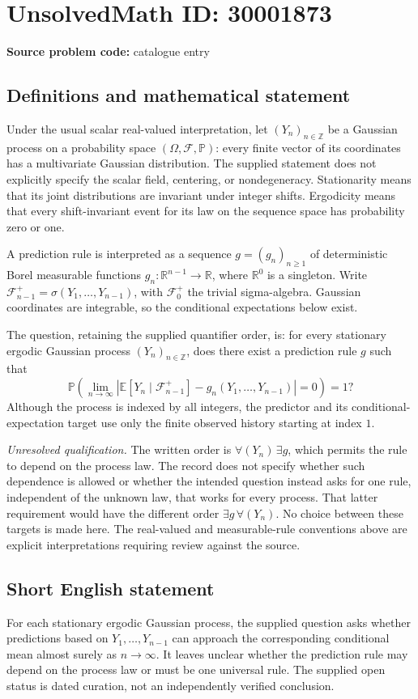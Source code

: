 \documentclass[11pt]{article}
\newcommand{\Z}{\mathbb{Z}}
\newcommand{\R}{\mathbb{R}}
\begin{document}
\section*{UnsolvedMath ID: 30001873}
\textbf{Source problem code:} catalogue entry
\subsection{Definitions and mathematical statement}
Under the usual scalar real-valued interpretation, let \((Y_n)_{n\in\Z}\) be a Gaussian process on a probability space \((\Omega,\mathcal F,\mathbb P)\): every finite vector of its coordinates has a multivariate Gaussian distribution. The supplied statement does not explicitly specify the scalar field, centering, or nondegeneracy. Stationarity means that its joint distributions are invariant under integer shifts. Ergodicity means that every shift-invariant event for its law on the sequence space has probability zero or one.

A prediction rule is interpreted as a sequence \(g=(g_n)_{n\geq1}\) of deterministic Borel measurable functions \(g_n:\R^{n-1}\to\R\), where \(\R^0\) is a singleton. Write \(\mathcal F_{n-1}^{+}=\sigma(Y_1,\ldots,Y_{n-1})\), with \(\mathcal F_0^{+}\) the trivial sigma-algebra. Gaussian coordinates are integrable, so the conditional expectations below exist.

The question, retaining the supplied quantifier order, is: for every stationary ergodic Gaussian process \((Y_n)_{n\in\Z}\), does there exist a prediction rule \(g\) such that
\[
\mathbb P\!\left(\lim_{n\to\infty}\left|\mathbb E[Y_n\mid\mathcal F_{n-1}^{+}]-g_n(Y_1,\ldots,Y_{n-1})\right|=0\right)=1?
\]
Although the process is indexed by all integers, the predictor and its conditional-expectation target use only the finite observed history starting at index \(1\).

\emph{Unresolved qualification.} The written order is \(\forall (Y_n)\,\exists g\), which permits the rule to depend on the process law. The record does not specify whether such dependence is allowed or whether the intended question instead asks for one rule, independent of the unknown law, that works for every process. That latter requirement would have the different order \(\exists g\,\forall (Y_n)\). No choice between these targets is made here. The real-valued and measurable-rule conventions above are explicit interpretations requiring review against the source.
\subsection{Short English statement}
For each stationary ergodic Gaussian process, the supplied question asks whether predictions based on \(Y_1,\ldots,Y_{n-1}\) can approach the corresponding conditional mean almost surely as \(n\to\infty\). It leaves unclear whether the prediction rule may depend on the process law or must be one universal rule. The supplied open status is dated curation, not an independently verified conclusion.
\end{document}
